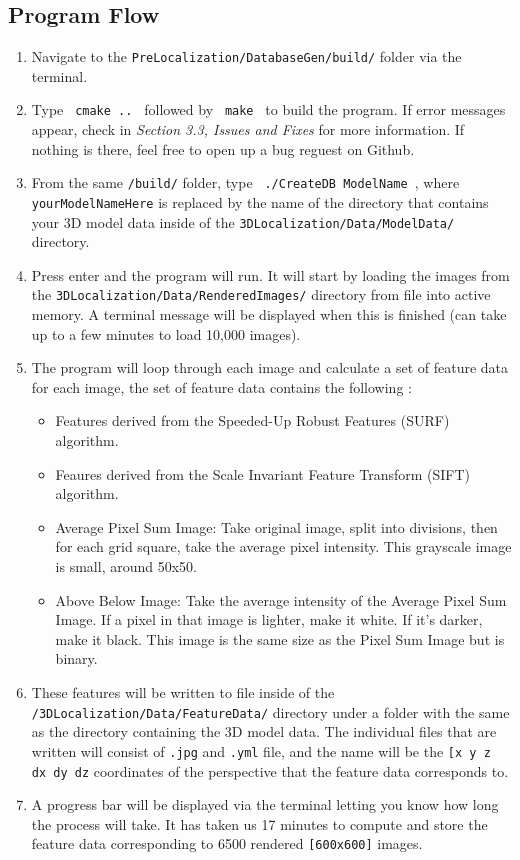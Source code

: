\documentclass[a4paper,11pt]{article}
\begin{document}
  \subsection{Program Flow}
    \begin{enumerate}
     \item Navigate to the \texttt{PreLocalization/DatabaseGen/build/} folder via the terminal.
     \item Type \texttt{ cmake .. } followed by \texttt{ make } to build the program. If error messages appear, check in \emph{Section 3.3, Issues and Fixes} for more information. If nothing is there, feel free to open up a bug reguest on Github.
     \item From the same \texttt{/build/} folder, type \texttt{  ./CreateDB ModelName  }, where \texttt{yourModelNameHere} is replaced by the name of the directory that contains your 3D model data inside of the \texttt{3DLocalization/Data/ModelData/} directory.
     \item Press enter and the program will run. It will start by loading the images from the \texttt{3DLocalization/Data/RenderedImages/} directory from file into active memory. A terminal message will be displayed when this is finished (can take up to a few minutes to load 10,000 images).
     \item The program will loop through each image and calculate a set of feature data for each image, the set of feature data contains the following :
       \begin{itemize}
        \item Features derived from the Speeded-Up Robust Features (SURF) algorithm. 
        \item Feaures derived from the Scale Invariant Feature Transform (SIFT) algorithm.
        \item Average Pixel Sum Image: Take original image, split into divisions, then for each grid square, take the average pixel intensity. This grayscale image is small, around 50x50.
        \item Above Below Image: Take the average intensity of the Average Pixel Sum Image. If a pixel in that image is lighter, make it white. If it's darker, make it black. This image is the same size as the Pixel Sum Image but is binary.
       \end{itemize}
     \item These features will be written to file inside of the \texttt{/3DLocalization/Data/FeatureData/} directory under a folder with the same as the directory containing the 3D model data. The individual files that are written will consist of \texttt{.jpg} and \texttt{.yml} file, and the name will be the \texttt{[x y z dx dy dz} coordinates of the perspective that the feature data corresponds to.
     \item A progress bar will be displayed via the terminal letting you know how long the process will take. It has taken us 17 minutes to compute and store the feature data corresponding to 6500 rendered \texttt{[600x600]} images.

    \end{enumerate}
    
\end{document}
